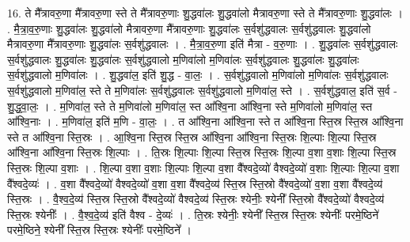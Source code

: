 \documentclass[17pt]{extarticle}
\begin{document}
16. ते मै᳚त्रावरु॒णा मै᳚त्रावरु॒णा स्ते ते मै᳚त्रावरु॒णाः शु॒द्धवा॑लः शु॒द्धवा॑लो मैत्रावरु॒णा स्ते ते मै᳚त्रावरु॒णाः शु॒द्धवा॑लः । . मै॒त्रा॒व॒रु॒णाः शु॒द्धवा॑लः शु॒द्धवा॑लो मैत्रावरु॒णा मै᳚त्रावरु॒णाः शु॒द्धवा॑लः स॒र्वशु॑द्धवालः स॒र्वशु॑द्धवालः शु॒द्धवा॑लो मैत्रावरु॒णा मै᳚त्रावरु॒णाः शु॒द्धवा॑लः स॒र्वशु॑द्धवालः । . मै॒त्रा॒व॒रु॒णा इति॑ मैत्रा - व॒रु॒णाः । . शु॒द्धवा॑लः स॒र्वशु॑द्धवालः स॒र्वशु॑द्धवालः शु॒द्धवा॑लः शु॒द्धवा॑लः स॒र्वशु॑द्धवालो म॒णिवा॑लो म॒णिवा॑लः स॒र्वशु॑द्धवालः शु॒द्धवा॑लः शु॒द्धवा॑लः स॒र्वशु॑द्धवालो म॒णिवा॑लः । . शु॒द्धवा॑ल॒ इति॑ शु॒द्ध - वा॒लः॒ । . स॒र्वशु॑द्धवालो म॒णिवा॑लो म॒णिवा॑लः स॒र्वशु॑द्धवालः स॒र्वशु॑द्धवालो म॒णिवा॑ल॒ स्ते ते म॒णिवा॑लः स॒र्वशु॑द्धवालः स॒र्वशु॑द्धवालो म॒णिवा॑ल॒ स्ते । . स॒र्वशु॑द्धवाल॒ इति॑ स॒र्व - शु॒द्ध॒वा॒लः॒ । . म॒णिवा॑ल॒ स्ते ते म॒णिवा॑लो म॒णिवा॑ल॒ स्त आ᳚श्वि॒ना आ᳚श्वि॒ना स्ते म॒णिवा॑लो म॒णिवा॑ल॒ स्त आ᳚श्वि॒नाः । . म॒णिवा॑ल॒ इति॑ म॒णि - वा॒लः॒ । . त आ᳚श्वि॒ना आ᳚श्वि॒ना स्ते त आ᳚श्वि॒ना स्ति॒स्र स्ति॒स्र आ᳚श्वि॒ना स्ते त आ᳚श्वि॒ना स्ति॒स्रः । . आ॒श्वि॒ना स्ति॒स्र स्ति॒स्र आ᳚श्वि॒ना आ᳚श्वि॒ना स्ति॒स्रः शि॒ल्पाः शि॒ल्पा स्ति॒स्र आ᳚श्वि॒ना आ᳚श्वि॒ना स्ति॒स्रः शि॒ल्पाः । . ति॒स्रः शि॒ल्पाः शि॒ल्पा स्ति॒स्र स्ति॒स्रः शि॒ल्पा व॒शा व॒शाः शि॒ल्पा स्ति॒स्र स्ति॒स्रः शि॒ल्पा व॒शाः । . शि॒ल्पा व॒शा व॒शाः शि॒ल्पाः शि॒ल्पा व॒शा वै᳚श्वदे॒व्यो॑ वैश्वदे॒व्यो॑ व॒शाः शि॒ल्पाः शि॒ल्पा व॒शा वै᳚श्वदे॒व्यः॑ । . व॒शा वै᳚श्वदे॒व्यो॑ वैश्वदे॒व्यो॑ व॒शा व॒शा वै᳚श्वदे॒व्य॑ स्ति॒स्र स्ति॒स्रो वै᳚श्वदे॒व्यो॑ व॒शा व॒शा वै᳚श्वदे॒व्य॑ स्ति॒स्रः । . वै॒श्व॒दे॒व्य॑ स्ति॒स्र स्ति॒स्रो वै᳚श्वदे॒व्यो॑ वैश्वदे॒व्य॑ स्ति॒स्रः श्येनीः॒ श्येनी᳚ स्ति॒स्रो वै᳚श्वदे॒व्यो॑ वैश्वदे॒व्य॑ स्ति॒स्रः श्येनीः᳚ । . वै॒श्व॒दे॒व्य॑ इति॑ वैश्व - दे॒व्यः॑ । . ति॒स्रः श्येनीः॒ श्येनी᳚ स्ति॒स्र स्ति॒स्रः श्येनीः᳚ परमे॒ष्ठिने॑ परमे॒ष्ठिने॒ श्येनी᳚ स्ति॒स्र स्ति॒स्रः श्येनीः᳚ परमे॒ष्ठिने᳚ । \newline
\end{document}
